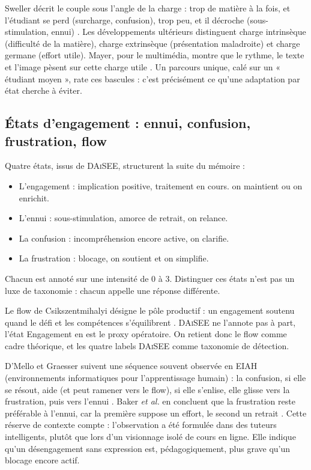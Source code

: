 Sweller décrit le couple sous l'angle de la charge : trop de matière à la
fois, et l'étudiant se perd (surcharge, confusion), trop peu, et il
décroche (sous-stimulation, ennui)
\cite{sweller1988cognitive,sweller2019cognitive}. Les développements
ultérieurs distinguent charge intrinsèque (difficulté de la matière),
charge extrinsèque (présentation maladroite) et charge germane (effort
utile). Mayer, pour le multimédia, montre que le rythme, le texte et
l'image pèsent sur cette charge utile \cite{mayer2021multimedia}. Un
parcours unique, calé sur un « étudiant moyen », rate ces bascules :
c'est précisément ce qu'une adaptation par état cherche à éviter.

\subsection{États d'engagement : ennui, confusion, frustration, flow}

Quatre états, issus de \textsc{DAiSEE}, structurent la suite du mémoire
\cite{gupta2016daisee} :
\begin{itemize}
  \item L'engagement : implication positive, traitement en cours.
    on maintient ou on enrichit.
  \item L'ennui : sous-stimulation, amorce de
    retrait, on relance.
  \item La confusion : incompréhension encore active, on clarifie.
  \item La frustration : blocage, on soutient et on simplifie.
\end{itemize}
Chacun est annoté sur une intensité de 0 à 3. Distinguer ces états n'est
pas un luxe de taxonomie : chacun appelle une réponse différente.

Le flow de Csikszentmihalyi désigne le pôle productif : un
engagement soutenu quand le défi et les compétences s'équilibrent
\cite{csikszentmihalyi1990flow}. \textsc{DAiSEE} ne l'annote pas à part, 
l'état Engagement en est le proxy opératoire. On retient donc le flow
comme cadre théorique, et les quatre labels \textsc{DAiSEE} comme
taxonomie de détection.

D'Mello et Graesser suivent une séquence souvent observée en EIAH
(environnements informatiques pour l'apprentissage humain) : la
confusion, si elle se résout, aide (et peut ramener vers le flow), si elle
s'enlise, elle glisse vers la frustration, puis vers l'ennui
\cite{dmello2012dynamics}. Baker \emph{et al.} en concluent que
la frustration reste préférable à l'ennui, car la première suppose
un effort, le second un retrait \cite{baker2010better}. Cette réserve de
contexte compte : l'observation a été formulée dans des tuteurs
intelligents, plutôt que lors d'un visionnage isolé de cours en ligne.
Elle indique qu'un désengagement sans expression est, pédagogiquement,
plus grave qu'un blocage encore actif.

